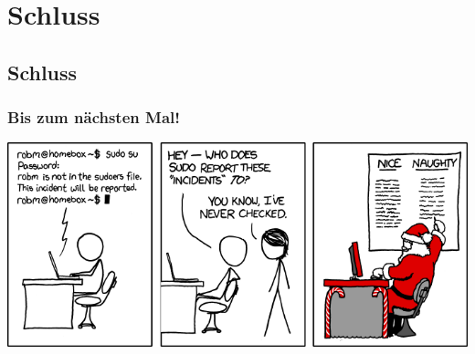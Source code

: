 \section{Schluss}
\subsection{Schluss}
\begin{frame}
\frametitle{Bis zum nächsten Mal!}
\begin{center}
	\includegraphics[width= \textwidth]{images/838_incident.png}
\end{center}
\end{frame}

